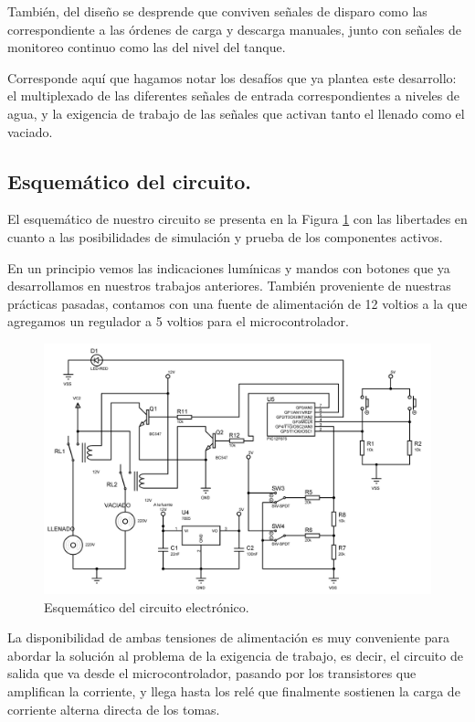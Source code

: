 ﻿\documentclass[a4paper]{article}
\begin{document}
También, del diseño se desprende que conviven señales de 
disparo como las correspondiente a las órdenes de carga y
descarga manuales, junto con señales de monitoreo continuo
como las del nivel del tanque.

Corresponde aquí que hagamos notar los desafíos que ya 
plantea este desarrollo: el multiplexado de las diferentes
señales de entrada correspondientes a niveles de agua, y 
la exigencia de trabajo de las señales que activan tanto el
llenado como el vaciado.

\subsection{Esquemático del circuito.}

El esquemático de nuestro circuito se presenta en la Figura
\ref{fig:esquematico} con las libertades en cuanto a las
posibilidades de simulación y prueba de los componentes 
activos.

En un principio vemos las indicaciones lumínicas y mandos 
con botones que ya desarrollamos en nuestros trabajos 
anteriores. También proveniente de nuestras prácticas
pasadas, contamos con una fuente de alimentación de 12 
voltios a la que agregamos un regulador a 5 voltios para el 
microcontrolador.

\begin{figure}[h]\centering
    \includegraphics[width=\textwidth]{tp3.jpg}
    \caption{Esquemático del circuito electrónico.}
    \label{fig:esquematico}
\end{figure}

La disponibilidad de ambas tensiones de alimentación es 
muy conveniente para abordar la solución al problema de 
la exigencia de trabajo, es decir, el circuito de salida 
que va desde el microcontrolador, pasando por los 
transistores que amplifican la corriente, y llega hasta 
los relé que finalmente sostienen la carga de corriente 
alterna directa de los tomas. 
\end{document}
